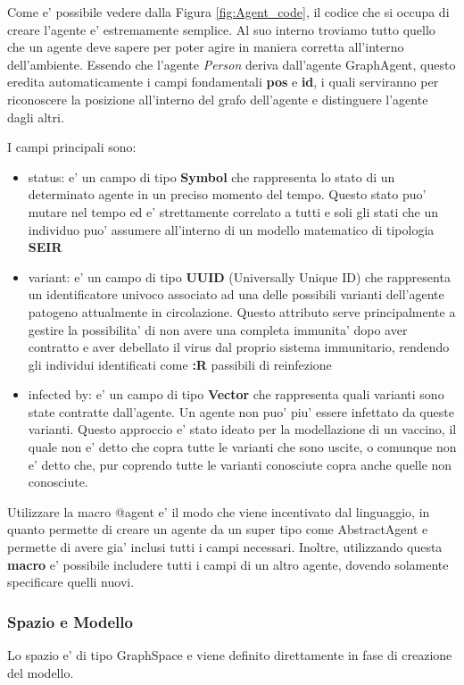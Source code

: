Come e' possibile vedere dalla Figura \ref{fig:Agent_code}, il codice che si occupa
di creare l'agente e' estremamente semplice. Al suo interno troviamo tutto quello che 
un agente deve sapere per poter agire in maniera corretta all'interno dell'ambiente. 
Essendo che l'agente \emph{Person} deriva dall'agente GraphAgent, questo eredita 
automaticamente i campi fondamentali \textbf{pos} e \textbf{id}, i quali serviranno 
per riconoscere la posizione all'interno del grafo dell'agente e distinguere l'agente 
dagli altri.

I campi principali sono:
\begin{itemize}
	\item status: e' un campo di tipo \textbf{Symbol} che rappresenta 
	lo stato di un determinato agente in un preciso momento del tempo. 
	Questo stato puo' mutare nel tempo ed e' strettamente correlato a 
	tutti e soli gli stati che un individuo puo' assumere all'interno di
	un modello matematico di tipologia \textbf{SEIR}
	\item variant:  e' un campo di tipo \textbf{UUID} (Universally Unique ID)
	che rappresenta un identificatore univoco associato ad una delle possibili
	varianti dell'agente patogeno attualmente in circolazione. Questo attributo 
	serve principalmente a gestire la possibilita' di non avere una completa
	immunita' dopo aver contratto e aver debellato il virus dal proprio sistema 
	immunitario, rendendo gli individui identificati come \textbf{:R} 
	passibili di reinfezione
	\item infected by: e' un campo di tipo \textbf{Vector} che rappresenta 
	quali varianti sono state contratte dall'agente. Un agente non puo' piu'
	essere infettato da queste varianti. Questo approccio e' stato ideato per 
	la modellazione di un vaccino, il quale non e' detto che copra tutte le
	varianti che sono uscite, o comunque non e' detto che, pur coprendo tutte le
	varianti conosciute copra anche quelle non conosciute.
\end{itemize}

Utilizzare la macro @agent e' il modo che viene incentivato dal linguaggio, in quanto
permette di creare un agente da un super tipo come AbstractAgent e permette di avere 
gia' inclusi tutti i campi necessari. Inoltre, utilizzando questa \textbf{macro} e' 
possibile includere tutti i campi di un altro agente, dovendo solamente specificare quelli 
nuovi.

\subsubsection*{Spazio e Modello}
Lo spazio e' di tipo GraphSpace e viene definito direttamente in 
fase di creazione del modello. 

